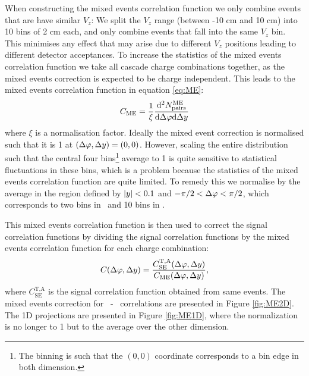     When constructing the mixed events correlation function we only combine events that are have similar $V_z$: We split the $V_z$ range (between -10 cm and 10 cm) into 10 bins of 2 cm each, and only combine events that fall into the same $V_z$ bin. This minimises any effect that may arise due to different $V_z$ positions leading to different detector acceptances. To increase the statistics of the mixed events correlation function we take all cascade charge combinations together, as the mixed events correction is expected to be charge independent. This leads to the mixed events correlation function in equation \ref{eq:ME}:
    \begin{align}
      C_\text{ME} = \frac{1}{\xi} \frac{\mathrm{d}^2N^\text{ME}_\text{pairs}}{\mathrm{d}\Delta\varphi \mathrm{d}\Delta y} \label{eq:ME}
    \end{align}
    where $\xi$ is a normalisation factor. Ideally the mixed event correction is normalised such that it is 1 at $(\Delta\varphi,\Delta y) = (0,0)$. However, scaling the entire distribution such that the central four bins\footnote{The binning is such that the $(0,0)$ coordinate corresponds to a bin edge in both dimension.} average to 1 is quite sensitive to statistical fluctuations in these bins, which is a problem because the  statistics of the mixed events correlation function are quite limited. To remedy this we normalise by the average in the region defined by $|y| < 0.1$ and $-\pi/2 < \Delta\varphi < \pi/2$, which corresponds to two bins in \dy\ and 10 bins in \dphi. 
    
    This mixed events correlation function is then used to correct the signal correlation functions by dividing the signal correlation functions by the mixed events correlation function for each charge combination: 
    \begin{align*}
      C(\Delta\varphi, \Delta y) = \frac{C^\text{T,A}_\text{SE}(\Delta\varphi, \Delta y)}{C_\text{ME}(\Delta\varphi, \Delta y)}, 
    \end{align*}
    where $C^\text{T,A}_\text{SE}$ is the signal correlation function obtained from same events. The mixed events correction for \Xi\ - \Xi\ correlations are presented in Figure \ref{fig:ME2D}. The 1D projections are presented in Figure \ref{fig:ME1D}, where the normalization is no longer to 1 but to the average over the other dimension. 

